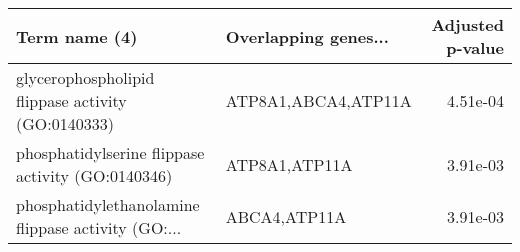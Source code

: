 \begin{tabular}{llr}
\toprule
                                     Term name (4) & Overlapping genes... &  Adjusted p-value \\
\midrule
glycerophospholipid flippase activity (GO:0140333) &  ATP8A1,ABCA4,ATP11A &          4.51e-04 \\
 phosphatidylserine flippase activity (GO:0140346) &        ATP8A1,ATP11A &          3.91e-03 \\
phosphatidylethanolamine flippase activity (GO:... &         ABCA4,ATP11A &          3.91e-03 \\
\bottomrule
\end{tabular}
